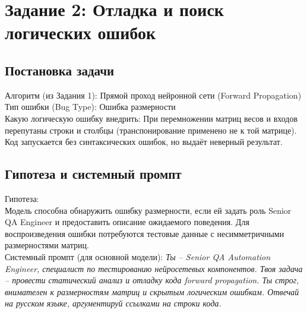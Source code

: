 \section*{Задание 2: Отладка и поиск логических ошибок}
\subsection{Постановка задачи}
\noindent
Алгоритм (из Задания 1): Прямой проход нейронной сети (Forward Propagation) \\
Тип ошибки (Bug Type): Ошибка размерности \\
Какую логическую ошибку внедрить: При перемножении матриц весов и входов перепутаны строки и столбцы (транспонирование применено не к той матрице). Код запускается без синтаксических ошибок, но выдаёт неверный результат.
\newpage
\subsection{Гипотеза и системный промпт}
Гипотеза: \\
Модель способна обнаружить ошибку размерности, если ей задать роль Senior QA Engineer и предоставить описание ожидаемого поведения. Для воспроизведения ошибки потребуются тестовые данные с несимметричными размерностями матриц.\\
\newline
Системный промпт (для основной модели):
\textit{Ты – Senior QA Automation Engineer, специалист по тестированию нейросетевых компонентов. Твоя задача – провести статический анализ и отладку кода forward propagation. Ты строг, внимателен к размерностям матриц и скрытым логическим ошибкам. Отвечай на русском языке, аргументируй ссылками на строки кода.}
